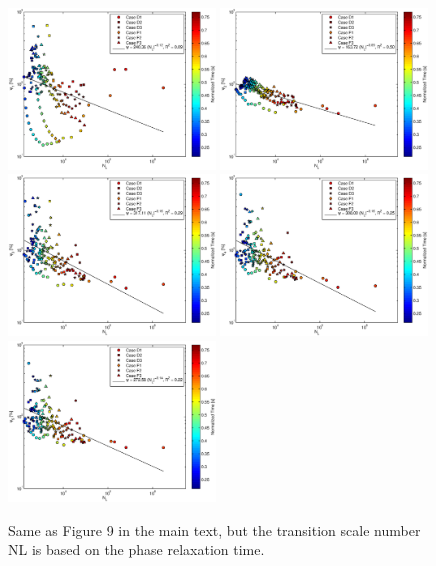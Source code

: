 \documentclass{article}
\begin{document}
\begin{figure}\centering
\includegraphics[width=0.49\textwidth]{Figures/phi1nl_phase}
\includegraphics[width=0.49\textwidth]{Figures/phi2nl_phase}\\
\includegraphics[width=0.49\textwidth]{Figures/phi3nl_phase}
\includegraphics[width=0.49\textwidth]{Figures/phi4nl_phase}\\
\includegraphics[width=0.49\textwidth]{Figures/phi5nl_phase}
\caption{Same as Figure 9 in the main text, but the transition scale number NL is based on
the phase relaxation time.}
\end{figure}
\end{document}
